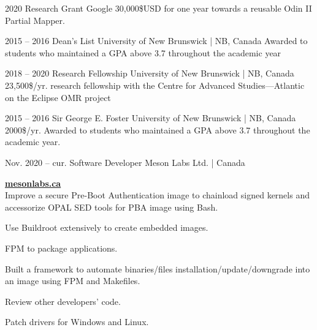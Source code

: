 \documentclass{developercv} %
\begin{document}

\entrys
{2020}
{Research Grant}
{Google}
{30,000\$USD for one year towards a reusable Odin II Partial Mapper.\footnotemark}


\entrys
{2015 -- 2016}
{Dean's List}
{University of New Brunswick | NB, Canada}
{Awarded to students who maintained a GPA above 3.7 throughout the academic year}


\entrys
{2018 -- 2020}
{Research Fellowship}
{University of New Brunswick | NB, Canada}
{23,500\$/yr. research fellowship  with the Centre for Advanced Studies---Atlantic on the Eclipse OMR project}

\entrys
{2015 -- 2016}
{Sir George E. Foster}
{University of New Brunswick | NB, Canada}
{2000\$/yr. Awarded to students who maintained a GPA above 3.7 throughout the academic year.}


\entrys
{Nov. 2020 -- cur.}
{Software Developer}
{Meson Labs Ltd. | Canada}{
	\textbf{\href{https://www.mesonlabs.ca/}{mesonlabs.ca}}\\
	Improve a secure Pre-Boot Authentication image to chainload signed kernels and accessorize OPAL SED tools for PBA image using Bash.
	\begin{tightemize}
		\item Use Buildroot extensively to create embedded images.
		\item FPM to package applications.
		\item Built a framework to automate binaries/files installation/update/downgrade into an image using FPM and Makefiles.
		\item Review other developers' code.
		\item Patch drivers for Windows and Linux.
	\end{tightemize}
}
\end{document}
